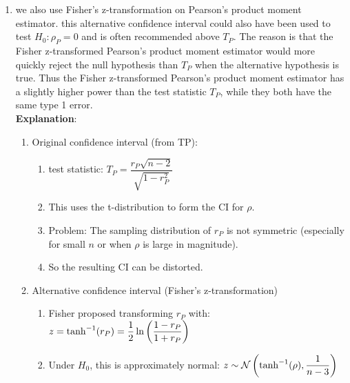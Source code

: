 \begin{enumerate}
    \item we also use Fisher’s z-transformation on Pearson’s product moment estimator. 
    this alternative confidence interval could also have been used to test $H_0 : \rho_P = 0$ and is often recommended above $T _P $. 
    The reason is that the Fisher z-transformed Pearson’s product moment estimator would more quickly reject the null hypothesis than $T _P$ when the alternative hypothesis is true. 
    Thus the Fisher z-transformed Pearson’s product moment estimator has a slightly higher power than the test statistic $T _P $, while they both have the same type 1 error.
    \hfill \cite{statistics/book/Statistics-for-Data-Scientists/Maurits-Kaptein}
    \\
    \textbf{Explanation}:
    \hfill\cite{common/online/chatgpt}
    \begin{enumerate}
        \item Original confidence interval (from TP):
        \hfill\cite{common/online/chatgpt}
        \begin{enumerate}
            \item test statistic: $T _P = \dfrac{r _P \sqrt{n - 2}}{\sqrt{1 - r^2_P}}$
            \hfill\cite{common/online/chatgpt}

            \item This uses the t-distribution to form the CI for $\rho$.
            \hfill\cite{common/online/chatgpt}

            \item Problem: The sampling distribution of $r_P$ is not symmetric (especially for small $n$ or when $\rho$ is large in magnitude).
            \hfill\cite{common/online/chatgpt}

            \item So the resulting CI can be distorted.
            \hfill\cite{common/online/chatgpt}
        \end{enumerate}

        \item Alternative confidence interval (Fisher’s z-transformation)
        \hfill\cite{common/online/chatgpt}
        \begin{enumerate}
            \item Fisher proposed transforming $r_P$ with: $z=\tanh^{-1}(r_P)=\dfrac{1}{2}\ln\left(\dfrac{1-r_P}{1+r_P}\right)$
            \hfill\cite{common/online/chatgpt}

            \item Under $H_0$, this is approximately normal: $z\sim\mathcal{N}\left(\tanh^{-1}(\rho),\dfrac{1}{n-3}\right)$
            \hfill\cite{common/online/chatgpt}


\end{enumerate}
\end{enumerate}
\end{enumerate}

